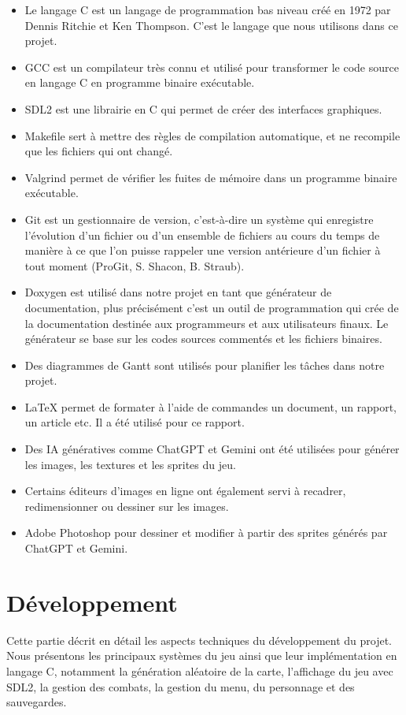 \documentclass[11pt,a4paper]{article}
\begin{document}
\begin{itemize}
\item Le langage C est un langage de programmation bas niveau créé en 1972 par Dennis Ritchie et Ken Thompson. C'est le langage que nous utilisons dans ce projet.
\item GCC est un compilateur très connu et utilisé pour transformer le code source en langage C en programme binaire exécutable.
\item SDL2 est une librairie en C qui permet de créer des interfaces graphiques.
\item Makefile sert à mettre des règles de compilation automatique, et ne recompile que les fichiers qui ont changé.
\item Valgrind permet de vérifier les fuites de mémoire dans un programme binaire exécutable.
\item Git est un gestionnaire de version, c'est-à-dire un système qui enregistre l'évolution d'un fichier ou d'un ensemble de fichiers au cours du temps de manière à ce que l'on puisse rappeler une version antérieure d'un fichier à tout moment (ProGit, S. Shacon, B. Straub).
\item Doxygen est utilisé dans notre projet en tant que générateur de documentation, plus précisément c'est un outil de programmation qui crée de la documentation destinée aux programmeurs et aux utilisateurs finaux. Le générateur se base sur les codes sources commentés et les fichiers binaires.
\item Des diagrammes de Gantt sont utilisés pour planifier les tâches dans notre projet.
\item LaTeX permet de formater à l'aide de commandes un document, un rapport, un article etc. Il a été utilisé pour ce rapport.
\item Des IA génératives comme ChatGPT et Gemini ont été utilisées pour générer les images, les textures et les sprites du jeu.
\item Certains éditeurs d'images en ligne ont également servi à recadrer, redimensionner ou dessiner sur les images.
\item Adobe Photoshop pour dessiner et modifier à partir des sprites générés par ChatGPT et Gemini.
\end{itemize}

\section{Développement}

Cette partie décrit en détail les aspects techniques du développement du projet.
Nous présentons les principaux systèmes du jeu ainsi que leur implémentation en langage C, notamment la génération aléatoire de la carte, l’affichage du jeu avec SDL2, la gestion des combats, la gestion du menu, du personnage et des sauvegardes.
\end{document}
